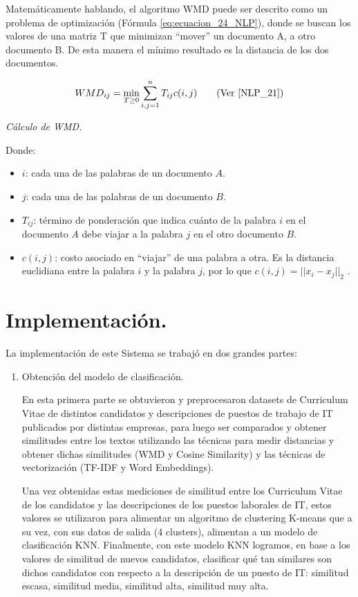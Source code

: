 \documentclass[12pt,a4paper]{article}
\begin{document}
\begin{sloppypar}
Matemáticamente hablando, el algoritmo WMD puede ser descrito como un problema de optimización (Fórmula \ref{eq:ecuacion_24_NLP}), donde se buscan los valores de una matriz T que minimizan “mover” un documento A, a otro documento B. De esta manera el mínimo resultado es la distancia de los dos documentos. 

\begin{equation}\label{eq:ecuacion_24_NLP}
WMD_{ij} = \min_{T\geq0} \sum_{i,j = 1}^{n} T_{ij} c(i,j)      \qquad \text{(Ver \cite{NLP_21})}
\end{equation}
\begin{center}
\textit{Cálculo de WMD.}
\end{center}

Donde:
\begin{itemize}
\item $i$: cada una de las palabras de un documento $A$.
\item $j$: cada una de las palabras de un documento $B$.
\item $T_{ij}$: término de ponderación que indica cuánto de la palabra $i$ en el documento $A$ debe viajar a la palabra $j$ en el otro documento $B$.
\item $c(i,j)$: costo asociado en “viajar” de una palabra a otra. Es la distancia euclidiana entre la palabra $i$ y la palabra $j$, por lo que $c(i,j) = ||x_{i} - x_{j}||_{2}$ \cite{wmd_paper}.

\end{itemize}

\cleardoublepage

\section{Implementación.}\label{5.Implementacion}

La implementación de este Sistema se trabajó en dos grandes partes:
\begin{enumerate}
\item Obtención del modelo de clasificación. 

En esta primera parte se obtuvieron y preprocesaron datasets de Curriculum Vitae de distintos candidatos y descripciones de puestos de trabajo de IT publicados por distintas empresas, para luego ser comparados y obtener similitudes entre los textos utilizando las técnicas para medir distancias y obtener dichas similitudes (WMD y Cosine Similarity) y las técnicas de vectorización (TF-IDF y Word Embeddings).

Una vez obtenidas estas mediciones de similitud entre los Curriculum Vitae de los candidatos y las descripciones de los puestos laborales de IT, estos valores se utilizaron para alimentar un algoritmo de clustering K-means que a su vez, con sus datos de salida (4 clusters), alimentan a un modelo de clasificación KNN. Finalmente, con este modelo KNN logramos, en base a los valores de similitud de nuevos candidatos, clasificar qué tan similares son dichos candidatos con respecto a la descripción de un puesto de IT: similitud escasa, similitud media, similitud alta, similitud muy alta.


\end{enumerate}
\end{sloppypar}
\end{document}
